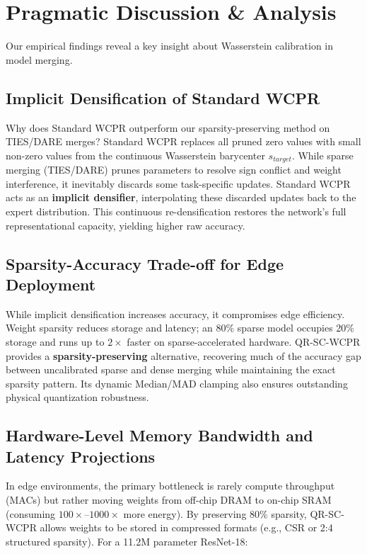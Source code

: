 \documentclass{article}
\theoremstyle{plain}
\theoremstyle{definition}
\theoremstyle{remark}
\begin{document}
\section{Pragmatic Discussion \& Analysis}
\label{sec:discussion}

Our empirical findings reveal a key insight about Wasserstein calibration in model merging.

\subsection{Implicit Densification of Standard WCPR}
Why does Standard WCPR outperform our sparsity-preserving method on TIES/DARE merges? Standard WCPR replaces all pruned zero values with small non-zero values from the continuous Wasserstein barycenter $s_{target}$. While sparse merging (TIES/DARE) prunes parameters to resolve sign conflict and weight interference, it inevitably discards some task-specific updates. Standard WCPR acts as an \textbf{implicit densifier}, interpolating these discarded updates back to the expert distribution. This continuous re-densification restores the network's full representational capacity, yielding higher raw accuracy.

\subsection{Sparsity-Accuracy Trade-off for Edge Deployment}
While implicit densification increases accuracy, it compromises edge efficiency. Weight sparsity reduces storage and latency; an 80\% sparse model occupies 20\% storage and runs up to $2\times$ faster on sparse-accelerated hardware. QR-SC-WCPR provides a \textbf{sparsity-preserving} alternative, recovering much of the accuracy gap between uncalibrated sparse and dense merging while maintaining the exact sparsity pattern. Its dynamic Median/MAD clamping also ensures outstanding physical quantization robustness.

\subsection{Hardware-Level Memory Bandwidth and Latency Projections}
In edge environments, the primary bottleneck is rarely compute throughput (MACs) but rather moving weights from off-chip DRAM to on-chip SRAM (consuming $100\times$--$1000\times$ more energy). By preserving 80\% sparsity, QR-SC-WCPR allows weights to be stored in compressed formats (e.g., CSR or 2:4 structured sparsity). For a 11.2M parameter ResNet-18:
\end{document}
